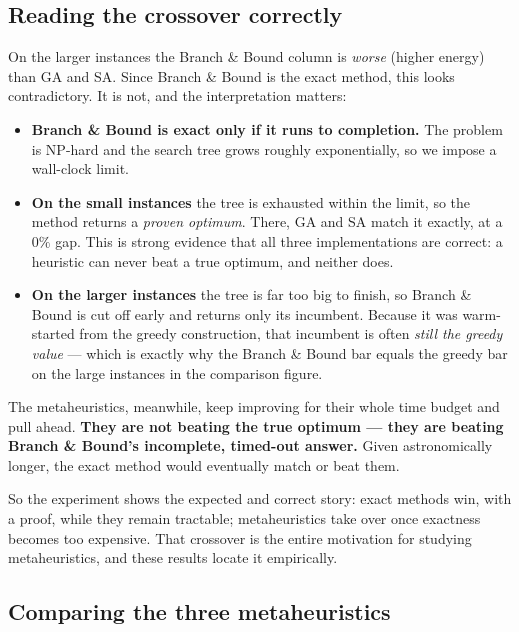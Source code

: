 \documentclass[11pt,a4paper]{article}
\begin{document}
\subsection{Reading the crossover correctly}

On the larger instances the Branch \& Bound column is \emph{worse} (higher energy)
than GA and SA. Since Branch \& Bound is the exact method, this looks
contradictory. It is not, and the interpretation matters:

\begin{itemize}
\item \textbf{Branch \& Bound is exact only if it runs to completion.} The problem
is NP-hard and the search tree grows roughly exponentially, so we impose a
wall-clock limit.

\item \textbf{On the small instances} the tree is exhausted within the limit, so
the method returns a \emph{proven optimum}. There, GA and SA match it exactly, at
a $0\%$ gap. This is strong evidence that all three implementations are correct:
a heuristic can never beat a true optimum, and neither does.

\item \textbf{On the larger instances} the tree is far too big to finish, so
Branch \& Bound is cut off early and returns only its incumbent. Because it was
warm-started from the greedy construction, that incumbent is often \emph{still the
greedy value} --- which is exactly why the Branch \& Bound bar equals the greedy
bar on the large instances in the comparison figure.
\end{itemize}

The metaheuristics, meanwhile, keep improving for their whole time budget and pull
ahead. \textbf{They are not beating the true optimum --- they are beating Branch \&
Bound's incomplete, timed-out answer.} Given astronomically longer, the exact
method would eventually match or beat them.

So the experiment shows the expected and correct story: exact methods win, with a
proof, while they remain tractable; metaheuristics take over once exactness
becomes too expensive. That crossover is the entire motivation for studying
metaheuristics, and these results locate it empirically.

\subsection{Comparing the three metaheuristics}
\end{document}
